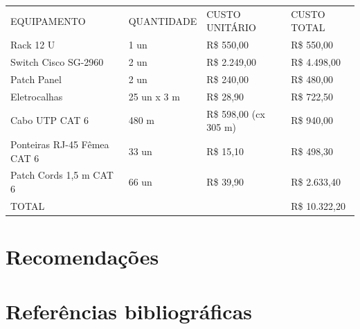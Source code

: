 \documentclass[	DIV=calc,
							paper=a4,
							fontsize=12pt,
							onecolumn]{scrartcl}
\begin{document}
\begin{table}[]
	\begin{tabular}{llll}
		EQUIPAMENTO                 & QUANTIDADE  & CUSTO UNITÁRIO        & CUSTO TOTAL   \\
		Rack 12 U                   & 1 un        & R\$ 550,00            & R\$ 550,00    \\
		Switch Cisco SG-2960        & 2 un        & R\$ 2.249,00          & R\$ 4.498,00  \\
		Patch Panel                 & 2 un        & R\$ 240,00            & R\$ 480,00    \\
		Eletrocalhas                & 25 un x 3 m & R\$ 28,90             & R\$ 722,50    \\
		Cabo UTP CAT 6              & 480 m       & R\$ 598,00 (cx 305 m) & R\$ 940,00    \\
		Ponteiras RJ-45 Fêmea CAT 6 & 33 un       & R\$ 15,10             & R\$ 498,30    \\
		Patch Cords 1,5 m CAT 6     & 66 un       & R\$ 39,90             & R\$ 2.633,40  \\
		\multicolumn{3}{l}{TOTAL}                                         & R\$ 10.322,20
	\end{tabular}
\end{table}

\section{Recomendações}

\section{Referências bibliográficas}



\renewcommand\refname{} %

  
\end{document}
